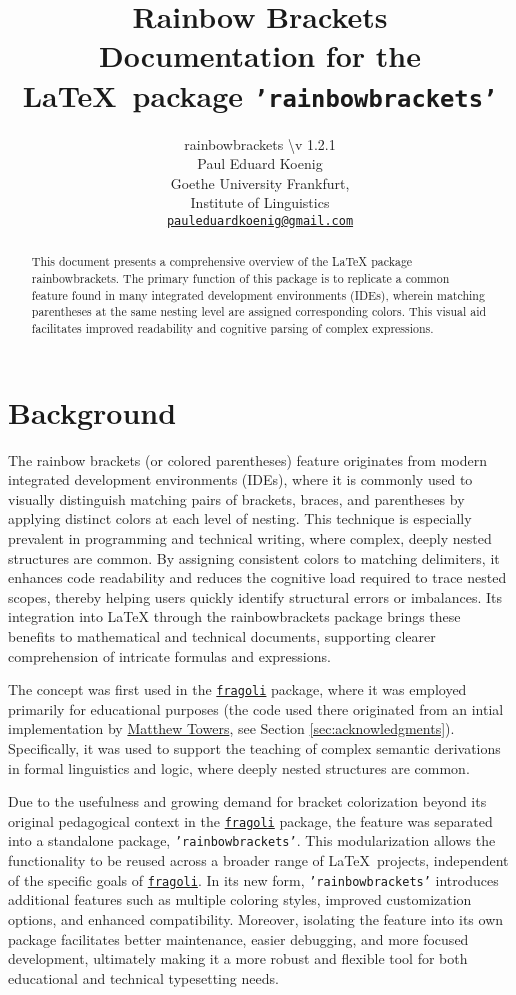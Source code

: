 \documentclass[10pt, a4paper]{article}
\title{Rainbow Brackets\\Documentation for the \LaTeX\ package \texttt{'rainbowbrackets'}}
\author{rainbowbrackets \textbackslash v 1.2.1\\Paul Eduard Koenig\\Goethe University Frankfurt,\\Institute of Linguistics\\\texttt{\href{mailto:pauleduardkoenig@gmail.com}{pauleduardkoenig@gmail.com}}}
\begin{document}
	\maketitle
	\begin{abstract}
		\noindent This document presents a comprehensive overview of the LaTeX package rainbowbrackets. The primary function of this package is to replicate a common feature found in many integrated development environments (IDEs), wherein matching parentheses at the same nesting level are assigned corresponding colors. This visual aid facilitates improved readability and cognitive parsing of complex expressions.
	\end{abstract}
	\tableofcontents
	\section{Background}
	The rainbow brackets (or colored parentheses) feature originates from modern integrated development environments (IDEs), where it is commonly used to visually distinguish matching pairs of brackets, braces, and parentheses by applying distinct colors at each level of nesting. This technique is especially prevalent in programming and technical writing, where complex, deeply nested structures are common. By assigning consistent colors to matching delimiters, it enhances code readability and reduces the cognitive load required to trace nested scopes, thereby helping users quickly identify structural errors or imbalances. Its integration into LaTeX through the rainbowbrackets package brings these benefits to mathematical and technical documents, supporting clearer comprehension of intricate formulas and expressions.
	
	The concept was first used in the \texttt{\href{https://ctan.org/pkg/fragoli}{fragoli}} package, where it was employed primarily for educational purposes (the code used there originated from an intial implementation by \href{https://github.com/matthew-towers}{Matthew Towers}, see Section \ref{sec:acknowledgments}). Specifically, it was used to support the teaching of complex semantic derivations in formal linguistics and logic, where deeply nested structures are common. 
	
	Due to the usefulness and growing demand for bracket colorization beyond its original pedagogical context in the \texttt{\href{https://ctan.org/pkg/fragoli}{fragoli}} package, the feature was separated into a standalone package, \texttt{'rainbowbrackets'}. This modularization allows the functionality to be reused across a broader range of \LaTeX\ projects, independent of the specific goals of \texttt{\href{https://ctan.org/pkg/fragoli}{fragoli}}. In its new form, \texttt{'rainbowbrackets'} introduces additional features such as multiple coloring styles, improved customization options, and enhanced compatibility. Moreover, isolating the feature into its own package facilitates better maintenance, easier debugging, and more focused development, ultimately making it a more robust and flexible tool for both educational and technical typesetting needs.
	
\end{document}
